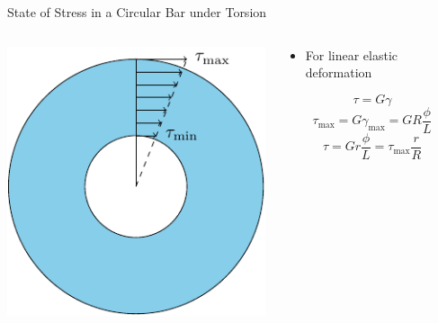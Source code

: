 \documentclass[10pt, svgnames]{beamer}
\begin{document}
\begin{frame}[label={sec:orga2e92fc}]{State of Stress in a Circular Bar under Torsion}
\begin{columns}
\begin{column}{0.5\columnwidth}
\begin{center}
\includegraphics[width=.9\linewidth]{pictures/shear-distribution.pdf}
\end{center}
\end{column}

\begin{column}{0.5\columnwidth}
\begin{itemize}
\item For linear elastic deformation
\end{itemize}

\[\tau = G \gamma\]
\[\tau_{\max} = G\gamma_{\max} = GR \frac{\phi}{L}\]
\[\tau = Gr\frac{\phi}{L} = \tau_{\max} \frac{r}{R}\]
\end{column}
\end{columns}
\end{frame}
\end{document}
